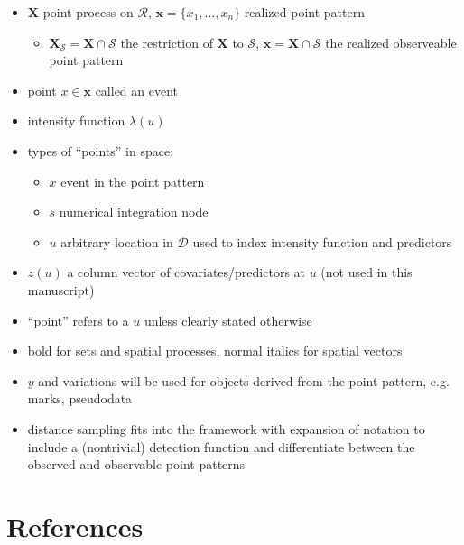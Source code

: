 \documentclass[review]{elsarticle}
\begin{document}
\begin{itemize}
\item \(\mathbf{X}\) point process on \(\mathcal{R}\), \(\mathbf{x} = \{x_{1},
\dots, x_{n}\}\) realized point pattern
\begin{itemize}
\item \(\mathbf{X}_{\mathcal{S}} = \mathbf{X} \cap \mathcal{S}\) the
 restriction of \(\mathbf{X}\) to \(\mathcal{S}\), \(\mathbf{x} = \mathbf{X}
\cap \mathcal{S}\) the realized observeable point pattern
\end{itemize}

\item point \(x \in \mathbf{x}\) called an event

\item intensity function \(\lambda(u)\)

\item types of ``points'' in space:
\begin{itemize}
\item \(x\) event in the point pattern
\item \(s\) numerical integration node
\item \(u\) arbitrary location in \(\mathcal{D}\) used to index intensity
function and predictors
\end{itemize}

\item \(z(u)\) a column vector of covariates/predictors at \(u\) (not used in
this manuscript)

\item ``point'' refers to a \(u\) unless clearly stated otherwise

\item bold for sets and spatial processes, normal italics for spatial vectors

\item \(y\) and variations will be used for objects derived from the point
pattern, e.g. marks, pseudodata

\item distance sampling fits into the framework with expansion of notation
to include a (nontrivial) detection function and differentiate between the
observed and observable point patterns

\end{itemize}




\section*{References}


\end{document}
